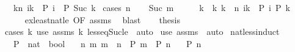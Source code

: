 \begin{isabellebody}
\ \ \ {\isachardoublequoteopen}{\isasymexists}k{\isacharless}{\kern0pt}n{\isachardot}{\kern0pt}\ {\isacharparenleft}{\kern0pt}{\isasymforall}i{\isasymle}k{\isachardot}{\kern0pt}\ {\isasymnot}\ P\ i{\isacharparenright}{\kern0pt}\ {\isasymand}\ P\ {\isacharparenleft}{\kern0pt}Suc\ k{\isacharparenright}{\kern0pt}{\isachardoublequoteclose}\isanewline
%
\isadelimproof
%
\endisadelimproof
%
\isatagproof
{}\isamarkupfalse%
\ {\isacharparenleft}{\kern0pt}cases\ n{\isacharparenright}{\kern0pt}\isanewline
\ \ \isamarkupfalse%
\ {\isacharparenleft}{\kern0pt}Suc\ m{\isacharparenright}{\kern0pt}\isanewline
\ \ \isamarkupfalse%
\ \isamarkupfalse%
\ k\ \ k{\isacharcolon}{\kern0pt}\ {\isachardoublequoteopen}k\ {\isasymle}\ n{\isachardoublequoteclose}\ {\isachardoublequoteopen}{\isasymforall}i{\isacharless}{\kern0pt}k{\isachardot}{\kern0pt}\ {\isasymnot}\ P\ i{\isachardoublequoteclose}\ {\isachardoublequoteopen}P\ k{\isachardoublequoteclose}\isanewline
\ \ \ \ \isamarkupfalse%
\ ex{\isacharunderscore}{\kern0pt}least{\isacharunderscore}{\kern0pt}nat{\isacharunderscore}{\kern0pt}le\ {\isacharbrackleft}{\kern0pt}OF\ assms{\isacharbrackright}{\kern0pt}\ \isamarkupfalse%
\ blast\isanewline
\ \ \isamarkupfalse%
\ {\isacharquery}{\kern0pt}thesis\ \isanewline
\ \ \ \ \isamarkupfalse%
\ {\isacharparenleft}{\kern0pt}cases\ k{\isacharparenright}{\kern0pt}\ {\isacharparenleft}{\kern0pt}use\ assms\ k\ less{\isacharunderscore}{\kern0pt}eq{\isacharunderscore}{\kern0pt}Suc{\isacharunderscore}{\kern0pt}le\ \ auto{\isacharparenright}{\kern0pt}\isanewline
{}\isamarkupfalse%
\ {\isacharparenleft}{\kern0pt}use\ assms\ \ auto{\isacharparenright}{\kern0pt}%
\endisatagproof
{\isafoldproof}%
%
\isadelimproof
\isanewline
%
\endisadelimproof
\isanewline
\isanewline
{}\isamarkupfalse%
\ nat{\isacharunderscore}{\kern0pt}less{\isacharunderscore}{\kern0pt}induct{\isacharcolon}{\kern0pt}\isanewline
\ \ \ P\ {\isacharcolon}{\kern0pt}{\isacharcolon}{\kern0pt}\ {\isachardoublequoteopen}nat\ {\isasymRightarrow}\ bool{\isachardoublequoteclose}\isanewline
\ \ \ {\isachardoublequoteopen}{\isasymAnd}n{\isachardot}{\kern0pt}\ {\isasymforall}m{\isachardot}{\kern0pt}\ m\ {\isacharless}{\kern0pt}\ n\ {\isasymlongrightarrow}\ P\ m\ {\isasymLongrightarrow}\ P\ n{\isachardoublequoteclose}\isanewline
\ \ \ {\isachardoublequoteopen}P\ n{\isachardoublequoteclose}\isanewline

\end{isabellebody}
